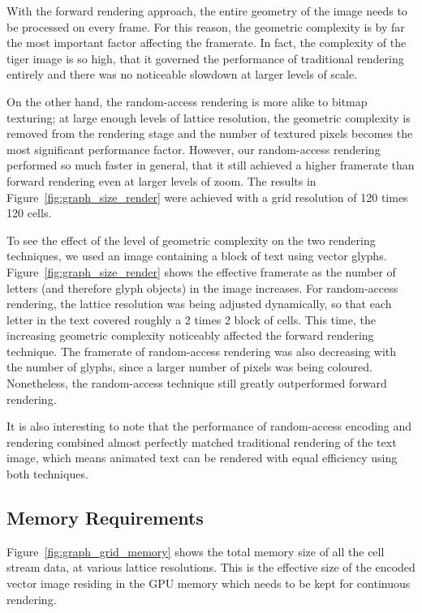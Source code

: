 \documentclass[11pt,a4paper,twoside]{article}
\begin{document}
With the forward rendering approach, the entire geometry of the image needs to be processed on every frame. For this reason, the geometric complexity is by far the most important factor affecting the framerate. In fact, the complexity of the tiger image is so high, that it governed the performance of traditional rendering entirely and there was no noticeable slowdown at larger levels of scale.

On the other hand, the random-access rendering is more alike to bitmap texturing; at large enough levels of lattice resolution, the geometric complexity is removed from the rendering stage and the number of textured pixels becomes the most significant performance factor. However, our random-access rendering performed so much faster in general, that it still achieved a higher framerate than forward rendering even at larger levels of zoom. The results in Figure~\ref{fig:graph_size_render} were achieved with a grid resolution of 120 times 120 cells.

To see the effect of the level of geometric complexity on the two rendering techniques, we used an image containing a block of text using vector glyphs. Figure~\ref{fig:graph_size_render} shows the effective framerate as the number of letters (and therefore glyph objects) in the image increases. For random-access rendering, the lattice resolution was being adjusted dynamically, so that each letter in the text covered roughly a 2 times 2 block of cells. This time, the increasing geometric complexity noticeably affected the forward rendering technique. The framerate of random-access rendering was also decreasing with the number of glyphs, since a larger number of pixels was being coloured. Nonetheless, the random-access technique still greatly outperformed forward rendering.

It is also interesting to note that the performance of random-access encoding and rendering combined almost perfectly matched traditional rendering of the text image, which means animated text can be rendered with equal efficiency using both techniques.

\subsection {Memory Requirements}

Figure~\ref{fig:graph_grid_memory} shows the total memory size of all the cell stream data, at various lattice resolutions. This is the effective size of the encoded vector image residing in the GPU memory which needs to be kept for continuous rendering.
\end{document}

